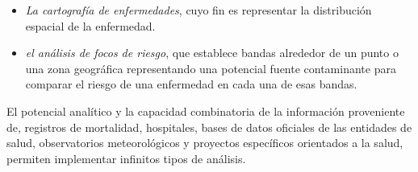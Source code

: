 \begin{itemize}
\item \textit{La cartografía de enfermedades}, cuyo fin es representar la distribución espacial de la enfermedad.

\item \textit{el análisis de focos de riesgo}, que establece bandas alrededor de un punto o una  zona geográfica representando una potencial  fuente contaminante para comparar el riesgo de una enfermedad en cada una de esas bandas.
\end{itemize}

El potencial analítico y la capacidad combinatoria de la información proveniente de, registros
de mortalidad, hospitales, bases de datos oficiales de las entidades de salud, observatorios
meteorológicos y proyectos específicos orientados a la salud, permiten implementar infinitos tipos
de análisis.
